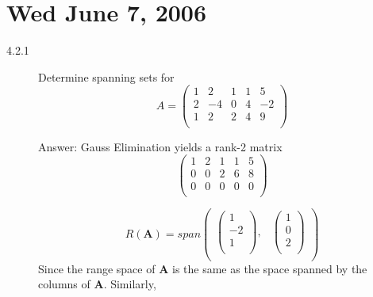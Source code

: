 \documentclass[times, 12pt]{article}
\begin{document}
\section{Wed June 7, 2006}
\begin{description}
\item[4.2.1] Determine spanning sets for
$$A = \left(
    \begin{array}{ccccc}
      1 & 2 & 1 & 1 & 5 \\
      2 & -4 & 0 & 4 & -2 \\
      1 & 2 & 2 & 4 & 9 \\
    \end{array}
  \right)
 $$

 Answer: Gauss Elimination yields a rank-2 matrix
$$\left(
    \begin{array}{ccccc}
      1 & 2 & 1 & 1 & 5 \\
      0 & 0 & 2 & 6 & 8 \\
      0 & 0 & 0 & 0 & 0 \\
    \end{array}
  \right)
 $$

$$R(\textbf{A}) = span\left(
                        \begin{array}{cc}
                          \left(
                            \begin{array}{c}
                              1 \\
                              -2 \\
                              1 \\
                            \end{array}
                          \right)
                           , & \left(
                               \begin{array}{c}
                                 1 \\
                                 0 \\
                                 2 \\
                               \end{array}
                             \right)
                            \\
                        \end{array}
                      \right) $$
Since the range space of \textbf{A} is the same as the space spanned
by the columns of \textbf{A}. Similarly,


\end{description}
\end{document}
